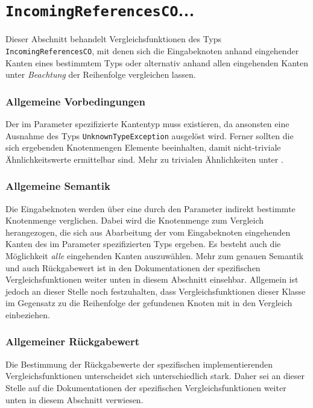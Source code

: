 %
%

\section{\texttt{IncomingReferencesCO}...}
\label{strct:spec:inrefsco}
Dieser Abschnitt behandelt Vergleichsfunktionen des Typs \texttt{IncomingReferencesCO}, mit denen sich die Eingabeknoten anhand eingehender Kanten eines bestimmtem Typs oder alternativ anhand allen eingehenden Kanten unter \emph{Beachtung} der Reihenfolge vergleichen lassen.

\subsubsection*{Allgemeine Vorbedingungen}
Der im Parameter spezifizierte Kantentyp muss existieren, da ansonsten eine Ausnahme des Typs \texttt{UnknownTypeException} ausgelöst wird. Ferner sollten die sich ergebenden Knotenmengen Elemente beeinhalten, damit nicht-triviale Ähnlichkeitswerte ermittelbar sind. Mehr zu trivialen Ähnlichkeiten unter .

\subsubsection*{Allgemeine Semantik}
Die Eingabeknoten werden über eine durch den Parameter indirekt bestimmte Knotenmenge verglichen. Dabei wird die Knotenmenge zum Vergleich herangezogen, die sich aus Abarbeitung der vom Eingabeknoten eingehenden Kanten des im Parameter spezifizierten Typs ergeben. Es besteht auch die Möglichkeit \emph{alle} eingehenden Kanten auszuwählen. Mehr zum genauen Semantik und auch Rückgabewert ist in den Dokumentationen der spezifischen Vergleichsfunktionen weiter unten in diesem Abschnitt einsehbar. Allgemein ist jedoch an dieser Stelle noch festzuhalten, dass Vergleichsfunktionen dieser Klasse im Gegensatz zu  die Reihenfolge der gefundenen Knoten mit in den Vergleich einbeziehen.

\subsubsection*{Allgemeiner Rückgabewert}
Die Bestimmung der Rückgabewerte der spezifischen implementierenden Vergleichsfunktionen unterscheidet sich unterschiedlich stark. Daher sei an dieser Stelle auf die Dokumentationen der spezifischen Vergleichsfunktionen weiter unten in diesem Abschnitt verwiesen.

